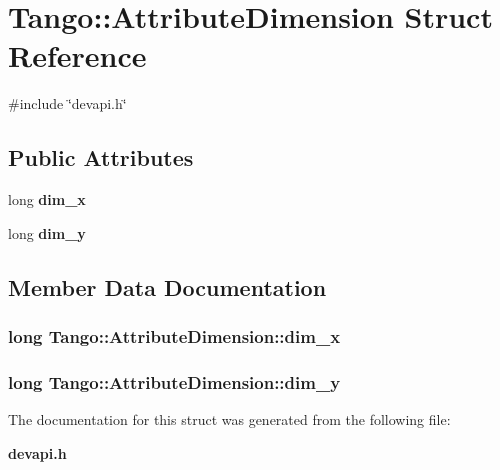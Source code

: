 \section{Tango\-:\-:Attribute\-Dimension Struct Reference}
\label{structTango_1_1AttributeDimension}


{\ttfamily \#include \char`\"{}devapi.\-h\char`\"{}}

\subsection*{Public Attributes}
\begin{DoxyCompactItemize}
\item 
long {\bf dim\-\_\-x}
\item 
long {\bf dim\-\_\-y}
\end{DoxyCompactItemize}


\subsection{Member Data Documentation}
\subsubsection[{dim\-\_\-x}]{\setlength{\rightskip}{0pt plus 5cm}long Tango\-::\-Attribute\-Dimension\-::dim\-\_\-x}\label{structTango_1_1AttributeDimension_a483a7f7db671828cb1fd467f34b30961}
\subsubsection[{dim\-\_\-y}]{\setlength{\rightskip}{0pt plus 5cm}long Tango\-::\-Attribute\-Dimension\-::dim\-\_\-y}\label{structTango_1_1AttributeDimension_aca8429fb212898c0367fcf5ab4c838a9}


The documentation for this struct was generated from the following file\-:\begin{DoxyCompactItemize}
\item 
{\bf devapi.\-h}\end{DoxyCompactItemize}
